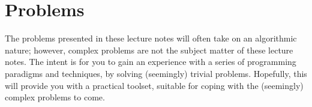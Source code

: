 \section*{Problems}

The problems presented in these lecture notes will often take on an algorithmic
nature; however, complex problems are not the subject matter of these lecture
notes. The intent is for you to gain an experience with a series of programming
paradigms and techniques, by solving (seemingly) trivial problems. Hopefully,
this will provide you with a practical toolset, suitable for coping with the
(seemingly) complex problems to come.

